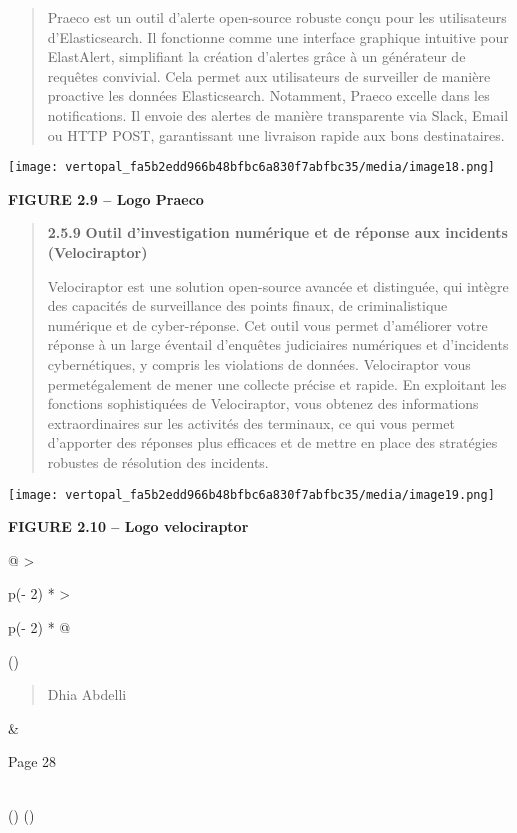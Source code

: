 \documentclass[
]{article}
\begin{document}
\begin{quote}
Praeco est un outil d'alerte open-source robuste conçu pour les
utilisateurs d'Elasticsearch. Il fonctionne comme une interface
graphique intuitive pour ElastAlert, simplifiant la création d'alertes
grâce à un générateur de requêtes convivial. Cela permet aux
utilisateurs de surveiller de manière proactive les données
Elasticsearch. Notamment, Praeco excelle dans les notifications. Il
envoie des alertes de manière transparente via Slack, Email ou HTTP
POST, garantissant une livraison rapide aux bons destinataires.
\end{quote}

\texttt{[image: vertopal\_fa5b2edd966b48bfbc6a830f7abfbc35/media/image18.png]}

\textbf{FIGURE 2.9 -- Logo Praeco}

\begin{quote}
\textbf{2.5.9} \textbf{Outil d'investigation numérique et de réponse aux
incidents (Velociraptor)}

Velociraptor est une solution open-source avancée et distinguée, qui
intègre des capacités de surveillance des points finaux, de
criminalistique numérique et de cyber-réponse. Cet outil vous permet
d'améliorer votre réponse à un large éventail d'enquêtes judiciaires
numériques et d'incidents cybernétiques, y compris les violations de
données. Velociraptor vous permetégalement de mener une collecte précise
et rapide. En exploitant les fonctions sophistiquées de Velociraptor,
vous obtenez des informations extraordinaires sur les activités des
terminaux, ce qui vous permet d'apporter des réponses plus efficaces et
de mettre en place des stratégies robustes de résolution des incidents.
\end{quote}

\texttt{[image: vertopal\_fa5b2edd966b48bfbc6a830f7abfbc35/media/image19.png]}

\textbf{FIGURE 2.10 -- Logo velociraptor}

\begin{longtable}[]{@{}
  >{\raggedright\arraybackslash}p{(\columnwidth - 2\tabcolsep) * }
  >{\raggedright\arraybackslash}p{(\columnwidth - 2\tabcolsep) * }@{}}
\toprule()
\begin{minipage}[b]{\linewidth}\raggedright
\begin{quote}
Dhia Abdelli
\end{quote}
\end{minipage} & \begin{minipage}[b]{\linewidth}\raggedright
Page 28
\end{minipage} \\
\midrule()
\endhead
\bottomrule()
\end{longtable}
\end{document}
